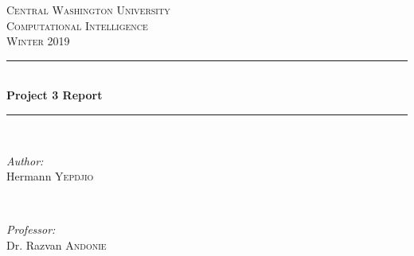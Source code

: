 \documentclass[12pt]{article}
\begin{document}
	
	\begin{titlepage}
		
		\newcommand{\HRule}{\rule{\linewidth}{0.5mm}} %
		
		\center %
		
		
		\textsc{\LARGE Central Washington University}\\[1.5cm] %
		\textsc{\Large Computational Intelligence}\\[0.5cm] %
		\textsc{\large Winter 2019}\\[0.5cm] %
		
		
		\HRule \\[0.4cm]
		{ \huge \bfseries Project 3 Report}\\[0.4cm] %
		\HRule \\[1.5cm]
		
		
		\begin{minipage}{0.4\textwidth}
			\begin{flushleft} \large
				\emph{Author:}\\
				Hermann \textsc{Yepdjio} %
			\end{flushleft}
		\end{minipage}
		~
		\begin{minipage}{0.4\textwidth}
			\begin{flushright} \large
				\emph{Professor:} \\
				Dr. Razvan \textsc{Andonie} %
			\end{flushright}
		\end{minipage}\\[1cm]
		

\end{titlepage}
\end{document}

